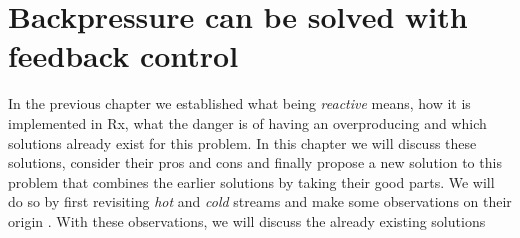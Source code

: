 \chapter{Backpressure can be solved with feedback control}

In the previous chapter we established what being \textit{reactive} means, how it is implemented in Rx, what the danger is of having an overproducing \obs and which solutions already exist for this problem. In this chapter we will discuss these solutions, consider their pros and cons and finally propose a new solution to this problem that combines the earlier solutions by taking their good parts. We will do so by first revisiting \textit{hot} and \textit{cold} streams and make some observations on their origin . With these observations, we will discuss the already existing solutions 

